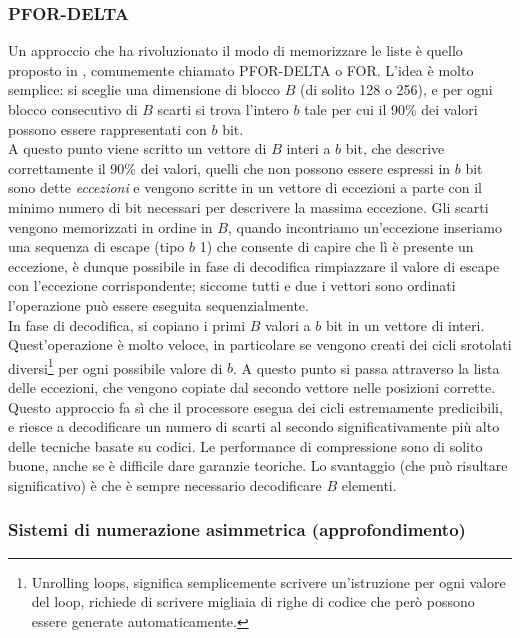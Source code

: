 \subsubsection{PFOR-DELTA}
Un approccio che ha rivoluzionato il modo di memorizzare le liste è quello proposto in %
, comunemente chiamato PFOR-DELTA o FOR. L'idea è molto semplice: si sceglie una dimensione di blocco $B$ (di solito 128 o 256), e per ogni blocco consecutivo di $B$ scarti si trova l'intero $b$ tale per cui il 90\% dei valori possono essere rappresentati con $b$ bit.\\
A questo punto viene scritto un vettore di $B$ interi a $b$ bit, che descrive correttamente il 90\% dei valori, quelli che non possono essere espressi in $b$ bit sono dette \textit{eccezioni} e vengono scritte in un vettore di eccezioni a parte con il minimo numero di bit necessari per descrivere la massima eccezione. Gli scarti vengono memorizzati in ordine in $B$, quando incontriamo un'eccezione inseriamo una sequenza di escape (tipo $b$ 1) che consente di capire che lì è presente un eccezione, è dunque possibile in fase di decodifica rimpiazzare il valore di escape con l'eccezione corrispondente; siccome tutti e due i vettori sono ordinati l'operazione può essere eseguita sequenzialmente.\\
In fase di decodifica, si copiano i primi $B$ valori a $b$ bit in un vettore di interi. Quest'operazione è molto veloce, in particolare se vengono creati dei cicli srotolati diversi\footnote{Unrolling loops, significa semplicemente scrivere un'istruzione per ogni valore del loop, richiede di scrivere migliaia di righe di codice che però possono essere generate automaticamente.} per ogni possibile valore di $b$. A questo punto si passa attraverso la lista delle eccezioni, che vengono copiate dal secondo vettore nelle posizioni corrette.\\
Questo approccio fa sì che il processore esegua dei cicli estremamente predicibili, e riesce a decodificare un numero di scarti al secondo significativamente più alto delle tecniche basate su codici. Le performance di compressione sono di solito buone, anche se è difficile dare garanzie teoriche. Lo svantaggio (che può risultare significativo) è che è sempre necessario decodificare $B$ elementi.
\subsubsection{Sistemi di numerazione asimmetrica (approfondimento)}

